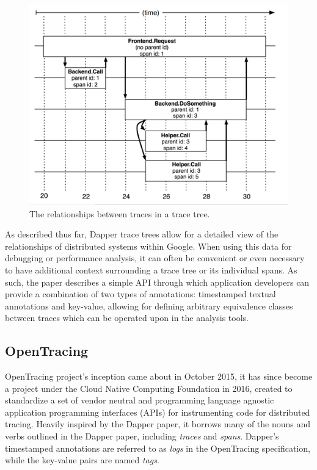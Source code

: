 \documentclass[12pt,pdftex,titlepage]{report}
\begin{document}
                \begin{figure}[htb!]
                    \centering
                    \includegraphics[scale=1]{dappertrace}
                    \caption{The relationships between traces in a trace tree.}
                    \label{fig:dappertrace}
                \end{figure}

                As described thus far, Dapper trace trees allow for a detailed view of the relationships of distributed systems within
                Google. When using this data for debugging or performance analysis, it can often be convenient or even necessary to 
                have additional context surrounding a trace tree or its individual spans. As such, the paper describes a simple API 
                through which application developers can provide a combination of two types of annotations: timestamped textual annotations
                and key-value, allowing for defining arbitrary equivalence classes between traces which can be operated upon in the analysis
                tools.

            \subsection{OpenTracing}
                OpenTracing\cite{opentracing} project's inception came about in October 2015, it has since become a project under the 
                Cloud Native Computing Foundation in 2016, created to standardize a set of vendor neutral and programming language agnostic
                application programming interfaces (APIs) for instrumenting code for distributed tracing. Heavily inspired by the Dapper
                paper, it borrows many of the nouns and verbs outlined in the Dapper paper, including \textit{traces} and \textit{spans}.
                Dapper's timestamped annotations are referred to as \textit{logs} in the OpenTracing specification, while the key-value pairs
                are named \textit{tags}. 
\end{document}

